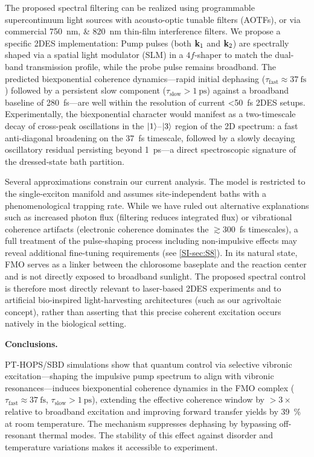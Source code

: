 \documentclass[journal=jpcl,manuscript=letter]{achemso}
\begin{document}
The proposed spectral filtering can be realized using programmable supercontinuum light sources with acousto-optic tunable filters (AOTFs),\cite{Gunthardt2023} or via commercial \SIlist{750;820}{\nano\meter} thin-film interference filters. We propose a specific 2DES implementation:\cite{Sebastian2024} Pump pulses (both $\vb{k}_1$ and $\vb{k}_2$) are spectrally shaped via a spatial light modulator (SLM) in a $4f$-shaper to match the dual-band transmission profile, while the probe pulse remains broadband.
The predicted biexponential coherence dynamics---rapid initial dephasing ($\tau_{\mathrm{fast}} \approx \SI{37}{\femto\second}$) followed by a persistent slow component ($\tau_{\mathrm{slow}} > \SI{1}{\pico\second}$) against a broadband baseline of \SI{280}{\femto\second}---are well within the resolution of current \SI{<50}{\femto\second} 2DES setups.\cite{Engel2007} Experimentally, the biexponential character would manifest as a two-timescale decay of cross-peak oscillations in the $\ket{1}$--$\ket{3}$ region of the 2D spectrum: a fast anti-diagonal broadening on the \SI{37}{\femto\second} timescale, followed by a slowly decaying oscillatory residual persisting beyond \SI{1}{\pico\second}---a direct spectroscopic signature of the dressed-state bath partition. 

Several approximations constrain our current analysis. The model is restricted to the single-exciton manifold and assumes site-independent baths with a phenomenological trapping rate. While we have ruled out alternative explanations such as increased photon flux (filtering reduces integrated flux) or vibrational coherence artifacts (electronic coherence dominates the $\gtrsim$\SI{300}{\femto\second} timescales), a full treatment of the pulse-shaping process including non-impulsive effects may reveal additional fine-tuning requirements (see \cref{SI-sec:S8}). In its natural state, FMO serves as a linker between the chlorosome baseplate and the reaction center and is not directly exposed to broadband sunlight.\cite{Blankenship2011} The proposed spectral control is therefore most directly relevant to laser-based 2DES experiments and to artificial bio-inspired light-harvesting architectures (such as our agrivoltaic concept), rather than asserting that this precise coherent excitation occurs natively in the biological setting.

\textbf{Conclusions.}

PT-HOPS/SBD simulations show that quantum control via selective vibronic excitation---shaping the impulsive pump spectrum to align with vibronic resonances---induces biexponential coherence dynamics in the FMO complex ($\tau_{\mathrm{fast}} \approx \SI{37}{\femto\second}$, $\tau_{\mathrm{slow}} > \SI{1}{\pico\second}$), extending the effective coherence window by $>3\times$ relative to broadband excitation and improving forward transfer yields by \SI{39}{\percent} at room temperature. The mechanism suppresses dephasing by bypassing off-resonant thermal modes. The stability of this effect against disorder and temperature variations makes it accessible to experiment.
\end{document}
